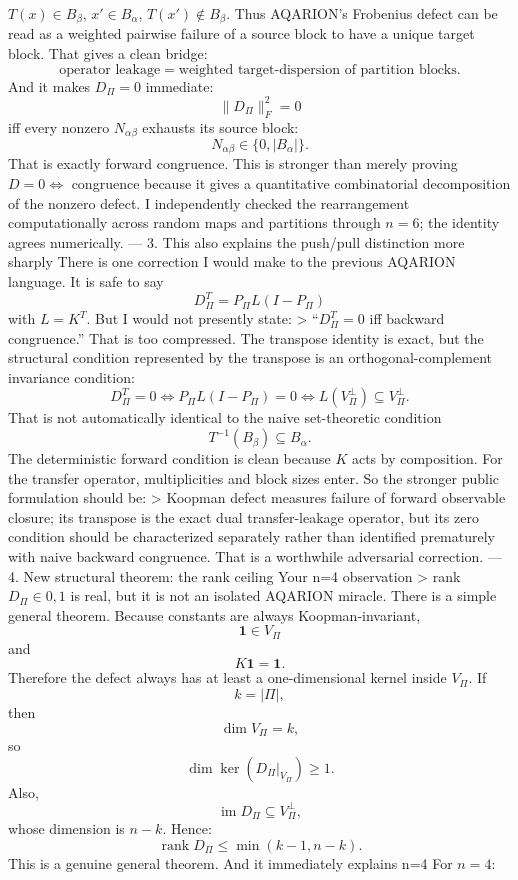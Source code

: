 \(T(x)\in B_\beta\),
\(x'\in B_\alpha\),
\(T(x')\notin B_\beta\).
Thus AQARION's Frobenius defect can be read as a weighted pairwise failure of a source block to have a unique target block.
That gives a clean bridge:
\[
\boxed{
\text{operator leakage}
=
\text{weighted target-dispersion of partition blocks}.
}
\]
And it makes \(D_\Pi=0\) immediate:
\[
\|D_\Pi\|_F^2=0
\]
iff every nonzero \(N_{\alpha\beta}\) exhausts its source block:
\[
N_{\alpha\beta}\in\{0,|B_\alpha|\}.
\]
That is exactly forward congruence.
This is stronger than merely proving \(D=0\iff\) congruence because it gives a quantitative combinatorial decomposition of the nonzero defect.
I independently checked the rearrangement computationally across random maps and partitions through \(n=6\); the identity agrees numerically.
---
3. This also explains the push/pull distinction more sharply
There is one correction I would make to the previous AQARION language.
It is safe to say
\[
D_\Pi^T=P_\Pi L(I-P_\Pi)
\]
with \(L=K^T\).
But I would not presently state:
> “\(D_\Pi^T=0\) iff backward congruence.”
That is too compressed.
The transpose identity is exact, but the structural condition represented by the transpose is an orthogonal-complement invariance condition:
\[
D_\Pi^T=0
\iff
P_\Pi L(I-P_\Pi)=0
\iff
L(V_\Pi^\perp)\subseteq V_\Pi^\perp.
\]
That is not automatically identical to the naive set-theoretic condition
\[
T^{-1}(B_\beta)\subseteq B_\alpha.
\]
The deterministic forward condition is clean because \(K\) acts by composition.
For the transfer operator, multiplicities and block sizes enter. So the stronger public formulation should be:
> Koopman defect measures failure of forward observable closure; its transpose is the exact dual transfer-leakage operator, but its zero condition should be characterized separately rather than identified prematurely with naive backward congruence.
That is a worthwhile adversarial correction.
---
4. New structural theorem: the rank ceiling
Your n=4 observation
> rank \(D_\Pi\in{0,1}\)
is real, but it is not an isolated AQARION miracle.
There is a simple general theorem.
Because constants are always Koopman-invariant,
\[
\mathbf 1\in V_\Pi
\]
and
\[
K\mathbf1=\mathbf1.
\]
Therefore the defect always has at least a one-dimensional kernel inside \(V_\Pi\).
If
\[
k=|\Pi|,
\]
then
\[
\dim V_\Pi=k,
\]
so
\[
\dim\ker(D_\Pi|_{V_\Pi})\ge1.
\]
Also,
\[
\operatorname{im}D_\Pi\subseteq V_\Pi^\perp,
\]
whose dimension is \(n-k\).
Hence:
\[
\boxed{
\operatorname{rank}D_\Pi
\le
\min(k-1,n-k).
}
\]
This is a genuine general theorem.
And it immediately explains n=4
For \(n=4\):

